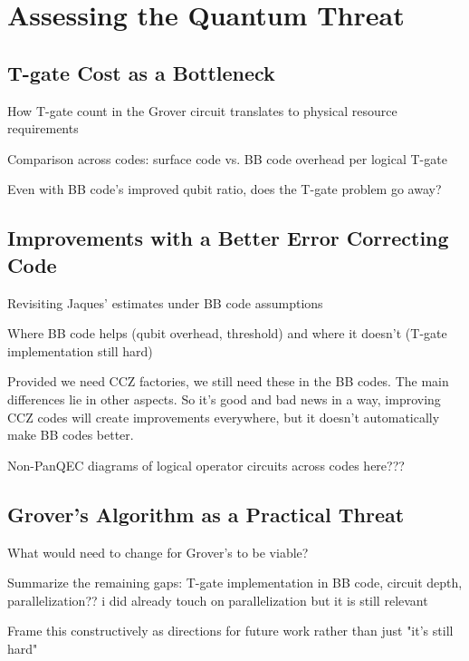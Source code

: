 \section{Assessing the Quantum Threat}

\subsection{T-gate Cost as a Bottleneck}
How T-gate count in the Grover circuit translates to physical resource requirements

Comparison across codes: surface code vs. BB code overhead per logical T-gate

Even with BB code's improved qubit ratio, does the T-gate problem go away?

\subsection{Improvements with a Better Error Correcting Code}
Revisiting Jaques' estimates under BB code assumptions

Where BB code helps (qubit overhead, threshold) and where it doesn't (T-gate implementation still hard)

Provided we need CCZ factories, we still need these in the BB codes. The main differences lie in other aspects. So it's good and bad news in a way, improving CCZ codes will create improvements everywhere, but it doesn't automatically make BB codes better.

Non-PanQEC diagrams of logical operator circuits across codes here??? 

\subsection{Grover's Algorithm as a Practical Threat}
What would need to change for Grover's to be viable? 

Summarize the remaining gaps: T-gate implementation in BB code, circuit depth, parallelization?? i did already touch on parallelization but it is still relevant

Frame this constructively as directions for future work rather than just "it's still hard"